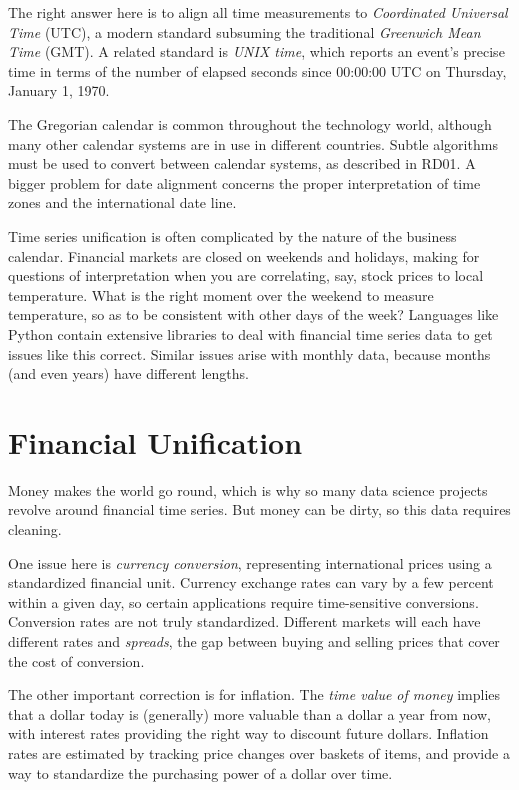 \documentclass[10pt]{article}
\begin{document}
The right answer here is to align all time measurements to \textit{Coordinated Universal Time} (UTC), a modern standard subsuming the traditional \textit{Greenwich Mean Time} (GMT). A related standard is \textit{UNIX time}, which reports an event's precise time in terms of the number of elapsed seconds since 00:00:00 UTC on Thursday, January 1, 1970.

The Gregorian calendar is common throughout the technology world, although many other calendar systems are in use in different countries. Subtle algorithms must be used to convert between calendar systems, as described in RD01. A bigger problem for date alignment concerns the proper interpretation of time zones and the international date line.

Time series unification is often complicated by the nature of the business calendar. Financial markets are closed on weekends and holidays, making for questions of interpretation when you are correlating, say, stock prices to local temperature. What is the right moment over the weekend to measure temperature, so as to be consistent with other days of the week? Languages like Python contain extensive libraries to deal with financial time series data to get issues like this correct. Similar issues arise with monthly data, because months (and even years) have different lengths.

\section*{Financial Unification}

Money makes the world go round, which is why so many data science projects revolve around financial time series. But money can be dirty, so this data requires cleaning.

One issue here is \textit{currency conversion}, representing international prices using a standardized financial unit. Currency exchange rates can vary by a few percent within a given day, so certain applications require time-sensitive conversions. Conversion rates are not truly standardized. Different markets will each have different rates and \textit{spreads}, the gap between buying and selling prices that cover the cost of conversion.

The other important correction is for inflation. The \textit{time value of money} implies that a dollar today is (generally) more valuable than a dollar a year from now, with interest rates providing the right way to discount future dollars. Inflation rates are estimated by tracking price changes over baskets of items, and provide a way to standardize the purchasing power of a dollar over time.
\end{document}
